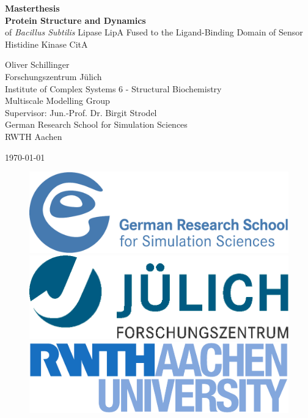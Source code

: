 \documentclass[english, a4paper, 12pt, titlepage, draft]{article}
\begin{document}

\begin{titlepage}
\begin{center}
{\huge \textbf{Masterthesis}}\\
\vspace{2cm}
{\large \textbf{Protein Structure and Dynamics} \\
\vspace{1cm}
of \textit{Bacillus Subtilis} Lipase LipA Fused to the Ligand-Binding Domain of Sensor Histidine Kinase CitA
}

\vspace{2cm}

Oliver Schillinger \\
Forschungszentrum J\"ulich \\ Institute of Complex Systems 6 - Structural Biochemistry \\ Multiscale Modelling Group \\
Supervisor: Jun.-Prof. Dr. Birgit Strodel \\
\vspace{1cm}
German Research School for Simulation Sciences \\
RWTH Aachen

\vspace{1cm}

\today

\vfill

\begin{figure}[h!]
\includegraphics[width=.3\textwidth]{figures/logos/grs_logo.pdf}
\hspace{0.5cm}
\includegraphics[width=.3\textwidth]{figures/logos/fzj_logo.pdf}
\hspace{0.5cm}
\includegraphics[width=.3\textwidth]{figures/logos/rwth_logo.pdf}
\end{figure}
 
\end{center}
\end{titlepage}
\end{document}

